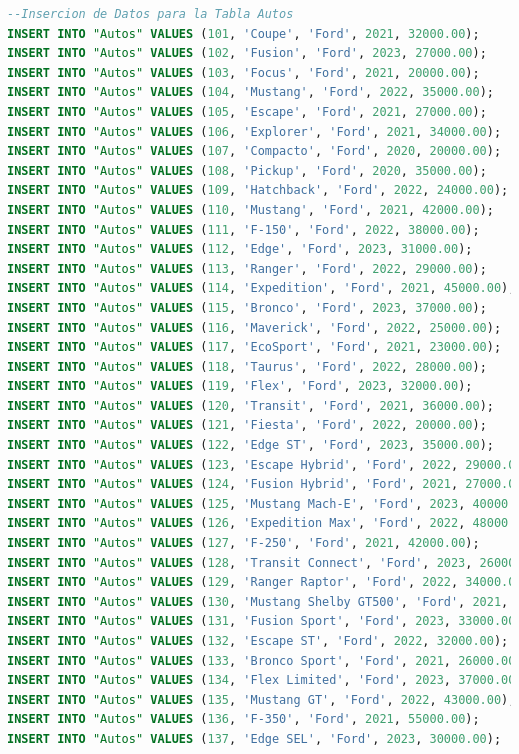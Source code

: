\documentclass[12pt]{article}
\begin{document}
\begin{lstlisting}[language=SQL]
--Insercion de Datos para la Tabla Autos
INSERT INTO "Autos" VALUES (101, 'Coupe', 'Ford', 2021, 32000.00);
INSERT INTO "Autos" VALUES (102, 'Fusion', 'Ford', 2023, 27000.00);
INSERT INTO "Autos" VALUES (103, 'Focus', 'Ford', 2021, 20000.00);
INSERT INTO "Autos" VALUES (104, 'Mustang', 'Ford', 2022, 35000.00);
INSERT INTO "Autos" VALUES (105, 'Escape', 'Ford', 2021, 27000.00);
INSERT INTO "Autos" VALUES (106, 'Explorer', 'Ford', 2021, 34000.00);
INSERT INTO "Autos" VALUES (107, 'Compacto', 'Ford', 2020, 20000.00);
INSERT INTO "Autos" VALUES (108, 'Pickup', 'Ford', 2020, 35000.00);
INSERT INTO "Autos" VALUES (109, 'Hatchback', 'Ford', 2022, 24000.00);
INSERT INTO "Autos" VALUES (110, 'Mustang', 'Ford', 2021, 42000.00);
INSERT INTO "Autos" VALUES (111, 'F-150', 'Ford', 2022, 38000.00);
INSERT INTO "Autos" VALUES (112, 'Edge', 'Ford', 2023, 31000.00);
INSERT INTO "Autos" VALUES (113, 'Ranger', 'Ford', 2022, 29000.00);
INSERT INTO "Autos" VALUES (114, 'Expedition', 'Ford', 2021, 45000.00);
INSERT INTO "Autos" VALUES (115, 'Bronco', 'Ford', 2023, 37000.00);
INSERT INTO "Autos" VALUES (116, 'Maverick', 'Ford', 2022, 25000.00);
INSERT INTO "Autos" VALUES (117, 'EcoSport', 'Ford', 2021, 23000.00);
INSERT INTO "Autos" VALUES (118, 'Taurus', 'Ford', 2022, 28000.00);
INSERT INTO "Autos" VALUES (119, 'Flex', 'Ford', 2023, 32000.00);
INSERT INTO "Autos" VALUES (120, 'Transit', 'Ford', 2021, 36000.00);
INSERT INTO "Autos" VALUES (121, 'Fiesta', 'Ford', 2022, 20000.00);
INSERT INTO "Autos" VALUES (122, 'Edge ST', 'Ford', 2023, 35000.00);
INSERT INTO "Autos" VALUES (123, 'Escape Hybrid', 'Ford', 2022, 29000.00);
INSERT INTO "Autos" VALUES (124, 'Fusion Hybrid', 'Ford', 2021, 27000.00);
INSERT INTO "Autos" VALUES (125, 'Mustang Mach-E', 'Ford', 2023, 40000.00);
INSERT INTO "Autos" VALUES (126, 'Expedition Max', 'Ford', 2022, 48000.00);
INSERT INTO "Autos" VALUES (127, 'F-250', 'Ford', 2021, 42000.00);
INSERT INTO "Autos" VALUES (128, 'Transit Connect', 'Ford', 2023, 26000.00);
INSERT INTO "Autos" VALUES (129, 'Ranger Raptor', 'Ford', 2022, 34000.00);
INSERT INTO "Autos" VALUES (130, 'Mustang Shelby GT500', 'Ford', 2021, 65000.00);
INSERT INTO "Autos" VALUES (131, 'Fusion Sport', 'Ford', 2023, 33000.00);
INSERT INTO "Autos" VALUES (132, 'Escape ST', 'Ford', 2022, 32000.00);
INSERT INTO "Autos" VALUES (133, 'Bronco Sport', 'Ford', 2021, 26000.00);
INSERT INTO "Autos" VALUES (134, 'Flex Limited', 'Ford', 2023, 37000.00);
INSERT INTO "Autos" VALUES (135, 'Mustang GT', 'Ford', 2022, 43000.00);
INSERT INTO "Autos" VALUES (136, 'F-350', 'Ford', 2021, 55000.00);
INSERT INTO "Autos" VALUES (137, 'Edge SEL', 'Ford', 2023, 30000.00);

\end{lstlisting}
\end{document}
